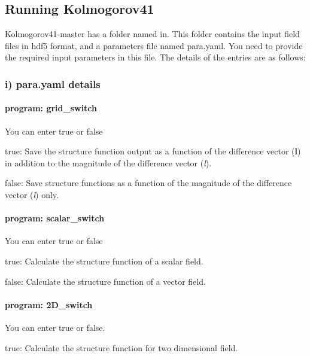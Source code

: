 \subsection*{Running {\ttfamily Kolmogorov41}}

{\ttfamily Kolmogorov41-\/master} has a folder named {\ttfamily in}. This folder contains the input field files in {\ttfamily hdf5} format, and a parameters file named {\ttfamily para.\-yaml}. You need to provide the required input parameters in this file. The details of the entries are as follows\-:

\subsubsection*{i) {\ttfamily para.\-yaml} details}

\paragraph*{{\ttfamily program\-: grid\-\_\-switch}}

You can enter {\ttfamily true} or {\ttfamily false}

{\ttfamily true}\-: Save the structure function output as a function of the difference vector ({\bfseries l}) in addition to the magnitude of the difference vector ({\itshape l}).

{\ttfamily false}\-: Save structure functions as a function of the magnitude of the difference vector ({\itshape l}) only.

\paragraph*{{\ttfamily program\-: scalar\-\_\-switch}}

You can enter {\ttfamily true} or {\ttfamily false}

{\ttfamily true}\-: Calculate the structure function of a scalar field.

{\ttfamily false}\-: Calculate the structure function of a vector field.

\paragraph*{{\ttfamily program\-: 2\-D\-\_\-switch}}

You can enter {\ttfamily true} or {\ttfamily false}.

{\ttfamily true}\-: Calculate the structure function for two dimensional field.

